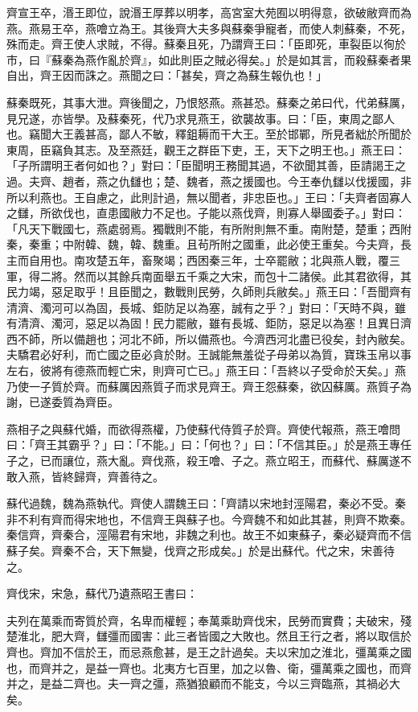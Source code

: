\begin{pinyinscope}
齊宣王卒，湣王即位，說湣王厚葬以明孝，高宮室大苑囿以明得意，欲破敝齊而為燕。燕易王卒，燕噲立為王。其後齊大夫多與蘇秦爭寵者，而使人刺蘇秦，不死，殊而走。齊王使人求賊，不得。蘇秦且死，乃謂齊王曰：「臣即死，車裂臣以徇於市，曰『蘇秦為燕作亂於齊』，如此則臣之賊必得矣。」於是如其言，而殺蘇秦者果自出，齊王因而誅之。燕聞之曰：「甚矣，齊之為蘇生報仇也！」

蘇秦既死，其事大泄。齊後聞之，乃恨怒燕。燕甚恐。蘇秦之弟曰代，代弟蘇厲，見兄遂，亦皆學。及蘇秦死，代乃求見燕王，欲襲故事。曰：「臣，東周之鄙人也。竊聞大王義甚高，鄙人不敏，釋鉏耨而干大王。至於邯鄲，所見者絀於所聞於東周，臣竊負其志。及至燕廷，觀王之群臣下吏，王，天下之明王也。」燕王曰：「子所謂明王者何如也？」對曰：「臣聞明王務聞其過，不欲聞其善，臣請謁王之過。夫齊、趙者，燕之仇讎也；楚、魏者，燕之援國也。今王奉仇讎以伐援國，非所以利燕也。王自慮之，此則計過，無以聞者，非忠臣也。」王曰：「夫齊者固寡人之讎，所欲伐也，直患國敝力不足也。子能以燕伐齊，則寡人舉國委子。」對曰：「凡天下戰國七，燕處弱焉。獨戰則不能，有所附則無不重。南附楚，楚重；西附秦，秦重；中附韓、魏，韓、魏重。且茍所附之國重，此必使王重矣。今夫齊，長主而自用也。南攻楚五年，畜聚竭；西困秦三年，士卒罷敝；北與燕人戰，覆三軍，得二將。然而以其餘兵南面舉五千乘之大宋，而包十二諸侯。此其君欲得，其民力竭，惡足取乎！且臣聞之，數戰則民勞，久師則兵敝矣。」燕王曰：「吾聞齊有清濟、濁河可以為固，長城、鉅防足以為塞，誠有之乎？」對曰：「天時不與，雖有清濟、濁河，惡足以為固！民力罷敝，雖有長城、鉅防，惡足以為塞！且異日濟西不師，所以備趙也；河北不師，所以備燕也。今濟西河北盡已役矣，封內敝矣。夫驕君必好利，而亡國之臣必貪於財。王誠能無羞從子母弟以為質，寶珠玉帛以事左右，彼將有德燕而輕亡宋，則齊可亡已。」燕王曰：「吾終以子受命於天矣。」燕乃使一子質於齊。而蘇厲因燕質子而求見齊王。齊王怨蘇秦，欲囚蘇厲。燕質子為謝，已遂委質為齊臣。

燕相子之與蘇代婚，而欲得燕權，乃使蘇代侍質子於齊。齊使代報燕，燕王噲問曰：「齊王其霸乎？」曰：「不能。」曰：「何也？」曰：「不信其臣。」於是燕王專任子之，已而讓位，燕大亂。齊伐燕，殺王噲、子之。燕立昭王，而蘇代、蘇厲遂不敢入燕，皆終歸齊，齊善待之。

蘇代過魏，魏為燕執代。齊使人謂魏王曰：「齊請以宋地封涇陽君，秦必不受。秦非不利有齊而得宋地也，不信齊王與蘇子也。今齊魏不和如此其甚，則齊不欺秦。秦信齊，齊秦合，涇陽君有宋地，非魏之利也。故王不如東蘇子，秦必疑齊而不信蘇子矣。齊秦不合，天下無變，伐齊之形成矣。」於是出蘇代。代之宋，宋善待之。

齊伐宋，宋急，蘇代乃遺燕昭王書曰：

夫列在萬乘而寄質於齊，名卑而權輕；奉萬乘助齊伐宋，民勞而實費；夫破宋，殘楚淮北，肥大齊，讎彊而國害：此三者皆國之大敗也。然且王行之者，將以取信於齊也。齊加不信於王，而忌燕愈甚，是王之計過矣。夫以宋加之淮北，彊萬乘之國也，而齊并之，是益一齊也。北夷方七百里，加之以魯、衛，彊萬乘之國也，而齊并之，是益二齊也。夫一齊之彊，燕猶狼顧而不能支，今以三齊臨燕，其禍必大矣。


\end{pinyinscope}
